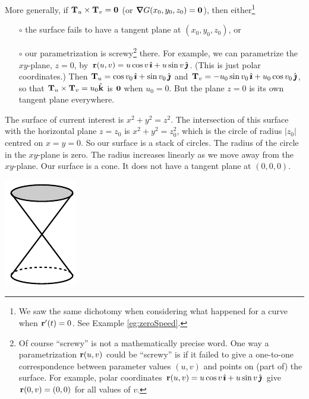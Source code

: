 \begin{eg}
More generally, if
$\mathbf{T}_u\times\mathbf{T}_v=\mathbf{0}$ (or $\vnabla G(x_0,y_0,z_0)=\vZero$), then
either\footnote{We saw the same dichotomy when considering what happened
for a curve when $\mathbf{r}'(t)=0$. See Example \ref{eg:zeroSpeed}.}
\begin{itemize}
\item[$\circ$]
the surface fails to have a tangent plane at $(x_0,y_0,z_0)$, or
\item[$\circ$]
our parametrization is screwy\footnote{Of course ``screwy'' is not 
a mathematically precise word. One way a parametrization
$\mathbf{r}(u,v)$ could be ``screwy'' is if it failed to give a 
one-to-one correspondence between parameter values $(u,v)$ and points
on (part of) the surface. For example, polar coordinates 
$\mathbf{r}(u,v) = u\cos v\,\hat{\pmb{\imath}} + u\sin v\,\hat{\pmb{\jmath}}$ give $\mathbf{r}(0,v)=(0,0)$ for all
values of $v$.} there. For example, we can parametrize the 
$xy$-plane, $z=0$, by $\mathbf{r}(u,v) = u\cos v\,\hat{\pmb{\imath}} + u\sin v\,\hat{\pmb{\jmath}}$. (This is just
polar coordinates.) Then 
$\mathbf{T}_u =  \cos v_0\,\hat{\pmb{\imath}} + \sin v_0\,\hat{\pmb{\jmath}} $ and
$\mathbf{T}_v =  -u_0\sin v_0\,\hat{\pmb{\imath}} + u_0\cos v_0\,\hat{\pmb{\jmath}}$, so that
$\mathbf{T}_u\times\mathbf{T}_v = u_0\hat{\mathbf{k}}$ is $\mathbf{0}$ when $u_0=0$. But the plane $z=0$
is its own tangent plane everywhere. 
\end{itemize}
The surface of current interest is $x^2+y^2=z^2$. The intersection of 
this surface with the horizontal plane $z=z_0$ is $x^2+y^2=z_0^2$, which is
the circle of radius $|z_0|$ centred on $x=y=0$. So our surface is a stack of
circles. The radius of the circle in the $xy$-plane is zero. The radius
increases linearly as we move away from the $xy$-plane. Our surface
is a cone. It does not have a tangent plane at $(0,0,0)$. 
\begin{efig}
\begin{center}
    \includegraphics{cone.pdf}
\end{center}
\end{efig}

\end{eg}


